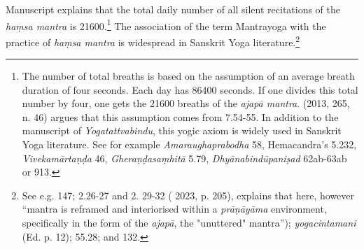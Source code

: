 Manuscript  explains that the total daily number of all silent recitations of the \textit{haṃsa mantra} is 21600.\footnote{The number of total breaths is based on the assumption of an average breath duration of four seconds. Each day has 86400 seconds. If one divides this total number by four, one gets the 21600 breaths of the \textit{ajapā mantra}. \citeauthor{birch2013} (2013, 265, n. 46) argues that this assumption comes from  7.54-55. In addition to the  manuscript of \textit{Yogatattvabindu}, this yogic axiom is widely used in Sanskrit Yoga literature. See for example \textit{Amaraughaprabodha} 58, Hemacandra's  5.232, \textit{Vivekamārtaṇḍa} 46, \textit{Gheraṇḍasaṃhitā} 5.79, \textit{Dhyānabindūpaniṣad} 62ab-63ab or  913.} The association of the term Mantrayoga with the practice of \textit{haṃsa mantra} is widespread in Sanskrit Yoga literature.\footnote{See e.g.  147;  2.26-27 and 2. 29-32 (\citeauthor{powell2023} 2023, p. 205), explains that here, however ``mantra is reframed and interiorised within a \textit{prāṇāyāma} environment, specifically in the form of the \textit{ajapā}, the "unuttered" mantra''); \emph{yogacintamani} (Ed. p. 12);  55.28; and  132.}

